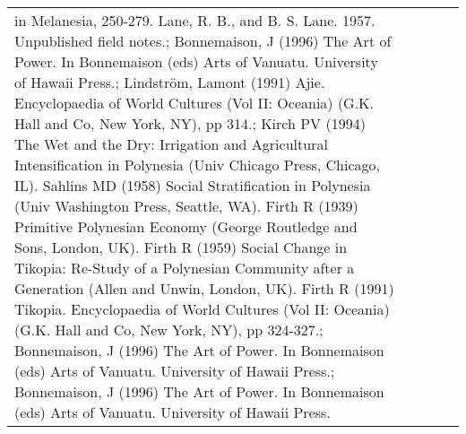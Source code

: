 \begin{longtable}{p{5cm}p{2cm}p{2cm}p{2cm}p{2cm}}
in Melanesia, 250-279. Lane, R. B., and B. S. Lane. 1957. Unpublished field notes.; Bonnemaison, J (1996) The Art of Power. In Bonnemaison (eds) Arts of Vanuatu. University of Hawaii Press.; Lindström, Lamont (1991) Ajie. Encyclopaedia of World Cultures (Vol II: Oceania) (G.K. Hall and Co, New York, NY), pp 314.; Kirch PV (1994) The Wet and the Dry: Irrigation and Agricultural Intensification in Polynesia (Univ Chicago Press, Chicago, IL). Sahlins MD (1958) Social Stratification in Polynesia (Univ Washington Press, Seattle, WA). Firth R (1939) Primitive Polynesian Economy (George Routledge and Sons, London, UK). Firth R (1959) Social Change in Tikopia: Re-Study of a Polynesian Community after a Generation (Allen and Unwin, London, UK). Firth R (1991) Tikopia. Encyclopaedia of World Cultures (Vol II: Oceania) (G.K. Hall and Co, New York, NY), pp 324-327.; Bonnemaison, J (1996) The Art of Power. In Bonnemaison (eds) Arts of Vanuatu. University of Hawaii Press.; Bonnemaison, J (1996) The Art of Power. In Bonnemaison (eds) Arts of Vanuatu. University of Hawaii Press. \\ 

\end{longtable}
